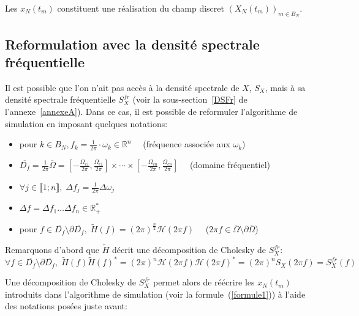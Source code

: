 \noindent Les $x_N(t_m)$ constituent une réalisation du champ discret $(X_N(t_m))_{m \in B_N}$.


\subsection{Reformulation avec la densité spectrale fréquentielle}

Il est possible que l'on n'ait pas accès à la densité spectrale de $X$, $S_X$, mais à sa densité spectrale fréquentielle $S^{fr}_X$ (voir la sous-section~\ref{DSFr} de l'annexe~\ref{annexeA}). Dans ce cas, il est possible de reformuler l'algorithme de simulation en imposant quelques notations:\\

\begin{itemize}
\item  pour $k \in B_N, f_k = \frac{1}{2\pi} \cdot \omega_k \in \mathbb{R}^n \quad$ (fréquence associée aux $\omega_k$)
  
\item $\overline{D_f} = \frac{1}{2\pi}\overline{\Omega} = [-\frac{\Omega_{c1}}{2\pi},\frac{\Omega_{c1}}{2\pi}] \times \cdots \times [-\frac{\Omega_{cn}}{2\pi},\frac{\Omega_{cn}}{2\pi}]\quad$ (domaine fréquentiel)

\item $\forall j \in \llbracket 1; n \rrbracket, \; \Delta f_j = \frac{1}{2\pi}\Delta \omega_j $

\item $\Delta f = \Delta f_1 \dots \Delta f_n \in \mathbb{R}^{*}_{+}$ 

\item pour $f \in \overline{D_f} \setminus \partial \overline{D_f}, \; \tilde{H}(f) = (2\pi)^{\frac{n}{2}}\mathcal{H}(2\pi f) \quad$ ($2\pi f \in \overline{\Omega} \setminus \partial\overline{\Omega}$)\\

\end{itemize}

\noindent Remarquons d'abord que $\tilde{H}$ décrit une décomposition de Cholesky de $S^{fr}_X$:
\begin{equation*}
 \forall f \in \overline{D_f} \setminus \partial \overline{D_f}, \; \tilde{H}(f)\tilde{H}(f)^{*} = (2\pi)^{n}\mathcal{H}(2\pi f)\mathcal{H}(2\pi f)^{*} = (2\pi)^{n}S_X(2\pi f) = S^{fr}_X(f)
\end{equation*}

\noindent Une décomposition de Cholesky de $S^{fr}_X$ permet alors de réécrire les $x_N(t_m)$ introduits dans l'algorithme de simulation (voir la formule~(\ref{formule1})) à l'aide des notations posées juste avant:

